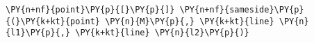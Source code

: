 \begin{Verbatim}[commandchars=\\\{\}]
    \PY{n+nf}{point}\PY{p}{[}\PY{p}{]} \PY{n+nf}{sameside}\PY{p}{(}\PY{k+kt}{point} \PY{n}{M}\PY{p}{,} \PY{k+kt}{line} \PY{n}{l1}\PY{p}{,} \PY{k+kt}{line} \PY{n}{l2}\PY{p}{)}
\end{Verbatim}
